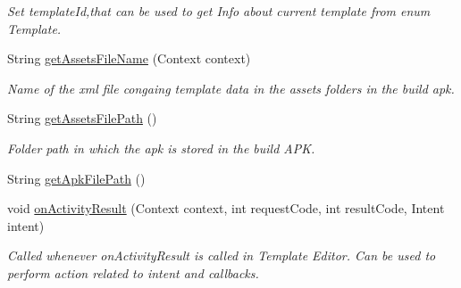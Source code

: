 \begin{DoxyCompactItemize}
\begin{DoxyCompactList}\small\item\em Set template\+Id,that can be used to get Info about current template from enum Template. \end{DoxyCompactList}\item 
String \hyperlink{classorg_1_1buildmlearn_1_1toolkit_1_1templates_1_1ComprehensionTemplate_addc67ab15b500972d3dd43e7fa571403}{get\+Assets\+File\+Name} (Context context)
\begin{DoxyCompactList}\small\item\em Name of the xml file congaing template data in the assets folders in the build apk. \end{DoxyCompactList}\item 
String \hyperlink{classorg_1_1buildmlearn_1_1toolkit_1_1templates_1_1ComprehensionTemplate_a8c674d70333e0901b8ebeb820b665a8c}{get\+Assets\+File\+Path} ()
\begin{DoxyCompactList}\small\item\em Folder path in which the apk is stored in the build A\+PK. \end{DoxyCompactList}\item 
String \hyperlink{classorg_1_1buildmlearn_1_1toolkit_1_1templates_1_1ComprehensionTemplate_a785de7d776818292fb31f8a357b0c136}{get\+Apk\+File\+Path} ()
\item 
void \hyperlink{classorg_1_1buildmlearn_1_1toolkit_1_1templates_1_1ComprehensionTemplate_a3448b0203bef64a67db4972cc113c81d}{on\+Activity\+Result} (Context context, int request\+Code, int result\+Code, Intent intent)
\begin{DoxyCompactList}\small\item\em Called whenever on\+Activity\+Result is called in Template Editor. Can be used to perform action related to intent and callbacks. \end{DoxyCompactList}\end{DoxyCompactItemize}
